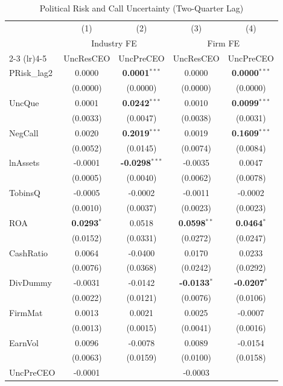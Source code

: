 \documentclass[11pt,a4paper]{article}
\begin{document}
\begin{table}[htbp]
\centering
\caption{Political Risk and Call Uncertainty (Two-Quarter Lag)}
\label{tab:h11_lag2}
\scriptsize
\begin{tabular}{lcccc}
\toprule
 & (1) & (2) & (3) & (4) \\
 & \multicolumn{2}{c}{Industry FE} & \multicolumn{2}{c}{Firm FE} \\
\cmidrule(lr){2-3} \cmidrule(lr){4-5}
 & UncResCEO & UncPreCEO & UncResCEO & UncPreCEO \\
\midrule
PRisk\_lag2 & 0.0000 & \textbf{0.0001}$^{***}$ & 0.0000 & \textbf{0.0000}$^{***}$ \\
 & (0.0000) & (0.0000) & (0.0000) & (0.0000) \\
\midrule
UncQue & 0.0001 & \textbf{0.0242}$^{***}$ & 0.0010 & \textbf{0.0099}$^{***}$ \\
 & (0.0033) & (0.0047) & (0.0038) & (0.0031) \\
NegCall & 0.0020 & \textbf{0.2019}$^{***}$ & 0.0019 & \textbf{0.1609}$^{***}$ \\
 & (0.0052) & (0.0145) & (0.0074) & (0.0084) \\
lnAssets & -0.0001 & \textbf{-0.0298}$^{***}$ & -0.0035 & 0.0047 \\
 & (0.0005) & (0.0040) & (0.0062) & (0.0078) \\
TobinsQ & -0.0005 & -0.0002 & -0.0011 & -0.0002 \\
 & (0.0010) & (0.0037) & (0.0023) & (0.0023) \\
ROA & \textbf{0.0293}$^{*}$ & 0.0518 & \textbf{0.0598}$^{**}$ & \textbf{0.0464}$^{*}$ \\
 & (0.0152) & (0.0331) & (0.0272) & (0.0247) \\
CashRatio & 0.0064 & -0.0400 & 0.0170 & 0.0233 \\
 & (0.0076) & (0.0368) & (0.0242) & (0.0292) \\
DivDummy & -0.0031 & -0.0142 & \textbf{-0.0133}$^{*}$ & \textbf{-0.0207}$^{*}$ \\
 & (0.0022) & (0.0121) & (0.0076) & (0.0106) \\
FirmMat & 0.0013 & 0.0021 & 0.0025 & -0.0007 \\
 & (0.0013) & (0.0015) & (0.0041) & (0.0016) \\
EarnVol & 0.0096 & -0.0078 & 0.0089 & -0.0154 \\
 & (0.0063) & (0.0159) & (0.0100) & (0.0158) \\
UncPreCEO & -0.0001 &  & -0.0003 &  \\

\end{tabular}
\end{table}
\end{document}
